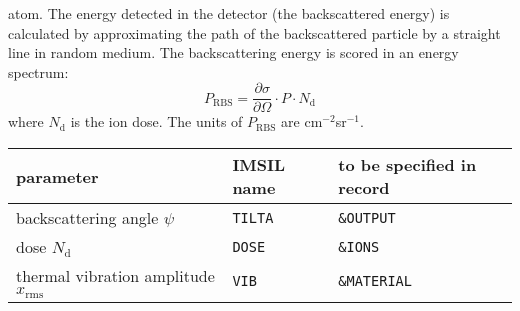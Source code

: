 atom.  The energy detected in the detector (the backscattered energy) is
calculated by approximating the path of the backscattered particle by a
straight line in random medium.  The backscattering energy is scored in an
energy spectrum:
%
\begin{equation}
  P_\mathrm{RBS} = \frac{\partial \sigma}{\partial \Omega} \cdot P \cdot
  N_\mathrm{d}
  \label{rbs:eq4}
\end{equation}
%
where $N_\mathrm{d}$ is the ion dose. The units of \texttt{$P_\mathrm{RBS}$} are
cm$^{-2}$sr$^{-1}$.
%
\begin{center}
\begin{tabular}{lll}
   parameter \quad & IMSIL name & to be specified in record \\
   \hline
   backscattering angle $\psi$  & {\tt TILTA}   & {\tt \&OUTPUT}   \\
   dose $N_\mathrm{d}$          & {\tt DOSE}    & {\tt \&IONS}     \\
   thermal vibration amplitude $x_\mathrm{rms}$ & {\tt VIB}    
                                                & {\tt \&MATERIAL} \\
\end{tabular}
\end{center}
